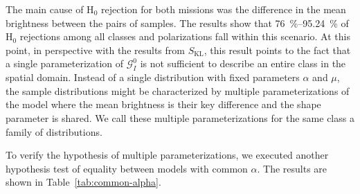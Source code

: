 The main cause of H$_{0}$ rejection for both missions was the difference in the mean brightness between the pairs of samples.
The results show that \qtyrange[range-phrase = \text{--}]{76}{95.24}{\percent} of H$_{0}$ rejections among all classes and polarizations fall within this scenario.
At this point, in perspective with the results from $S_{\mathrm{KL}}$, this result points to the fact that a single parameterization of $\mathcal G^0_I$ is not sufficient to describe an entire class in the spatial domain.
Instead of a single distribution with fixed parameters $\alpha$ and $\mu$, the sample distributions might be characterized by multiple parameterizations of the model where the mean brightness is their key difference and the shape parameter is shared.
We call these multiple parameterizations for the same class a family of distributions.

To verify the hypothesis of multiple parameterizations, we executed another hypothesis test of equality between models with common $\alpha$.
The results are shown in Table~\ref{tab:common-alpha}.

